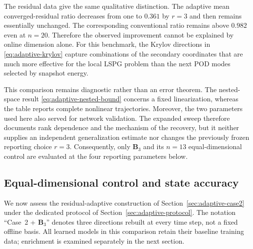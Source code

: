\documentclass[11pt]{article}
\begin{document}
The residual data give the same qualitative distinction.  The adaptive
mean converged-residual ratio decreases from one to $0.361$ by $r=3$ and
then remains essentially unchanged.  The corresponding conventional ratio
remains above $0.982$ even at $n=20$.  Therefore the observed improvement
cannot be explained by online dimension alone.  For this benchmark, the
Krylov directions in \eqref{eq:adaptive-krylov} capture combinations of the
secondary coordinates that are much more effective for the local LSPG
problem than the next POD modes selected by snapshot energy.

This comparison remains diagnostic rather than an error theorem.  The
nested-space result \eqref{eq:adaptive-nested-bound} concerns a fixed
linearization, whereas the table reports complete nonlinear trajectories.
Moreover, the two parameters used here also served for network validation.
The expanded sweep therefore documents rank dependence and the mechanism of
the recovery, but it neither supplies an independent generalization estimate
nor changes the previously frozen reporting choice $r=3$.  Consequently,
only $\mathbf B_3$ and its $n=13$ equal-dimensional control are evaluated at
the four reporting parameters below.

\subsection{Equal-dimensional control and state accuracy}
We now assess the residual-adaptive construction of
Section~\ref{sec:adaptive-case2} under the dedicated protocol of
Section~\ref{sec:adaptive-protocol}.  The notation ``Case~2 + $\mathbf B_3$''
denotes three directions rebuilt at every time step, not a fixed offline
basis.  All learned models in this comparison retain their baseline
training data; enrichment is examined separately in the next section.

\begin{table}[H]
\centering
\caption{Common-initialization full-residual comparison: state-history error
$e_u$ (\%).  Every learned model uses baseline training data.  The mean
averages the three in-domain points; the final column is extrapolatory.
The $n=13$ Case--2 row controls for the 13 online unknowns used by
Case~2+$\mathbf B_3$.  The linear PROM is the reference for the fixed
151-mode basis.}
\label{tab:adaptive-state}
\resizebox{\textwidth}{!}{}
\end{table}
\end{document}
